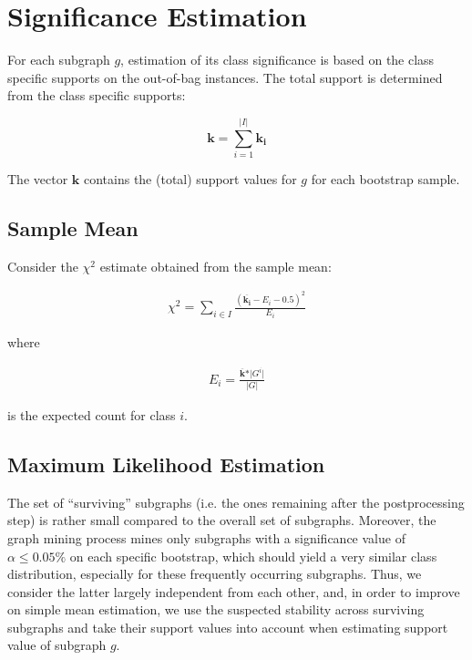 \documentclass{article}
\begin{document}
\section{Significance Estimation}
\label{s:significance-estimation}

For each subgraph $g$, estimation of its class significance is based on the class specific supports on the out-of-bag instances. 
The total support is determined from the class specific supports:

\begin{equation}
  \mathbf{k}=\sum_{i=1}^{\vert I\vert} \mathbf{k_i}
  \label{eqn:total-support}
\end{equation}

The vector $\mathbf{k}$ contains the (total) support values for $g$ for each bootstrap sample.

\subsection{Sample Mean}
\label{ss:simple-mean}

Consider the $\chi^2$ estimate obtained from the sample mean:

\begin{align}
  \chi^2 = \sum_{i \in I} \frac{(\overline{\mathbf{k_i}}-E_i-0.5)^2}{E_i} 
  \label{align:meanX2}
\end{align}

where 

\begin{align}
  E_i=\frac{\overline{\mathbf{k}}*\vert G^i\vert}{\vert G \vert}
\end{align}

is the expected count for class $i$.

\subsection{Maximum Likelihood Estimation}
\label{ss:MLE}

The set of ``surviving'' subgraphs (i.e. the ones remaining after the
postprocessing step) is rather small compared to the overall set of subgraphs.
Moreover, the graph mining process mines only subgraphs with a significance
value of $\alpha \le 0.05\%$ on each specific bootstrap, which should yield a very similar
class distribution, especially for these frequently occurring subgraphs.  Thus,
we consider the latter largely independent from each other, and, in order to
improve on simple mean estimation, we use the suspected stability across
surviving subgraphs and take their support values into account when estimating
support value of subgraph $g$. 
\end{document}

